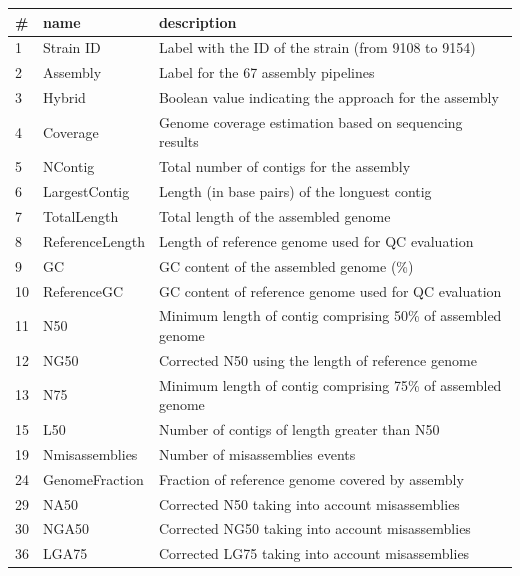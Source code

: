 \documentclass[11pt, a4paper,titlepage]{article}
\begin{document}
\begin{table}[h]
  \centering
  \begin{tabular}{|l|l|l|}
    \hline
    \# & name            & description                                                  \\ \hline
    1  & Strain ID       & Label with the ID of the strain (from 9108 to 9154)          \\
    2  & Assembly        & Label for the 67 assembly pipelines                          \\
    3  & Hybrid          & Boolean value indicating the approach for the assembly       \\ 
    4  & Coverage        & Genome coverage estimation based on sequencing results       \\
    5  & NContig         & Total number of contigs for the assembly                     \\
    6  & LargestContig   & Length (in base pairs) of the longuest contig                \\
    7  & TotalLength     & Total length of the assembled genome                         \\ 
    8  & ReferenceLength & Length of reference genome used for QC evaluation            \\ 
    9  & GC              & GC content of the assembled genome (\%)                      \\ 
    10 & ReferenceGC     & GC content of reference genome used for QC evaluation        \\
    11 & N50             & Minimum length of contig comprising 50\% of assembled genome \\ 
    12 & NG50            & Corrected N50 using the length of reference genome           \\ 
    13 & N75             & Minimum length of contig comprising 75\% of assembled genome \\ 
    15 & L50             & Number of contigs of length greater than N50                 \\ 
    19 & Nmisassemblies  & Number of misassemblies events                               \\ 
    24 & GenomeFraction  & Fraction of reference genome covered by assembly             \\ 
    29 & NA50            & Corrected N50 taking into account misassemblies              \\ 
    30 & NGA50           & Corrected NG50 taking into account misassemblies             \\ 
    36 & LGA75           & Corrected LG75 taking into account misassemblies             \\ \hline
  \end{tabular}
\end{table}
\end{document}

